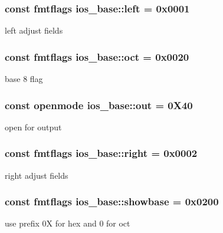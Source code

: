 \subsubsection[{\texorpdfstring{left}{left}}]{\setlength{\rightskip}{0pt plus 5cm}const {\bf fmtflags} ios\+\_\+base\+::left = 0x0001\hspace{0.3cm}{\ttfamily [static]}}\hypertarget{classios__base_ad364df9af2cfde1f40bd8e10c62bb215}{}\label{classios__base_ad364df9af2cfde1f40bd8e10c62bb215}
left adjust fields 
\subsubsection[{\texorpdfstring{oct}{oct}}]{\setlength{\rightskip}{0pt plus 5cm}const {\bf fmtflags} ios\+\_\+base\+::oct = 0x0020\hspace{0.3cm}{\ttfamily [static]}}\hypertarget{classios__base_a4155540f8d3ffdb8d25a2f50ee4df08f}{}\label{classios__base_a4155540f8d3ffdb8d25a2f50ee4df08f}
base 8 flag 
\subsubsection[{\texorpdfstring{out}{out}}]{\setlength{\rightskip}{0pt plus 5cm}const {\bf openmode} ios\+\_\+base\+::out = 0\+X40\hspace{0.3cm}{\ttfamily [static]}}\hypertarget{classios__base_a4c1d517774c0d11af3424e90395f26ae}{}\label{classios__base_a4c1d517774c0d11af3424e90395f26ae}
open for output 
\subsubsection[{\texorpdfstring{right}{right}}]{\setlength{\rightskip}{0pt plus 5cm}const {\bf fmtflags} ios\+\_\+base\+::right = 0x0002\hspace{0.3cm}{\ttfamily [static]}}\hypertarget{classios__base_aec064a12730b5d87e718c1864e29ac64}{}\label{classios__base_aec064a12730b5d87e718c1864e29ac64}
right adjust fields 
\subsubsection[{\texorpdfstring{showbase}{showbase}}]{\setlength{\rightskip}{0pt plus 5cm}const {\bf fmtflags} ios\+\_\+base\+::showbase = 0x0200\hspace{0.3cm}{\ttfamily [static]}}\hypertarget{classios__base_a7e3373ab307feecfc228bc9bdb29cd01}{}\label{classios__base_a7e3373ab307feecfc228bc9bdb29cd01}
use prefix 0X for hex and 0 for oct 
